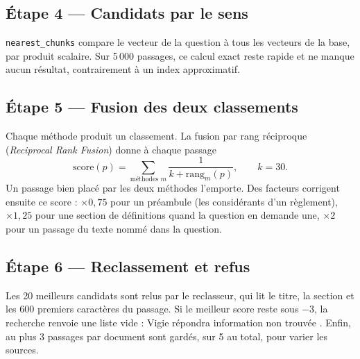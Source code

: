 \documentclass[11pt,a4paper]{article}
\newcommand{\fichier}[1]{\texttt{#1}}
\begin{document}
\subsection{Étape 4 --- Candidats par le sens}

\texttt{nearest\_chunks} compare le vecteur de la question à tous les vecteurs de la base, par produit scalaire. Sur 5\,000 passages, ce calcul exact reste rapide et ne manque aucun résultat, contrairement à un index approximatif.

\subsection{Étape 5 --- Fusion des deux classements}

Chaque méthode produit un classement. La fusion par rang réciproque (\emph{Reciprocal Rank Fusion}) donne à chaque passage
\[
\text{score}(p) = \sum_{\text{méthodes } m} \frac{1}{k + \text{rang}_m(p)}, \qquad k = 30.
\]
Un passage bien placé par les deux méthodes l'emporte. Des facteurs corrigent ensuite ce score : \(\times 0{,}75\) pour un préambule (les considérants d'un règlement), \(\times 1{,}25\) pour une section de définitions quand la question en demande une, \(\times 2\) pour un passage du texte nommé dans la question.



\subsection{Étape 6 --- Reclassement et refus}

Les 20 meilleurs candidats sont relus par le reclasseur, qui lit le titre, la section et les 600 premiers caractères du passage. Si le meilleur score reste sous \(-3\), la recherche renvoie une liste vide : Vigie répondra \og information non trouvée \fg. Enfin, au plus 3 passages par document sont gardés, sur 5 au total, pour varier les sources.


\end{document}

